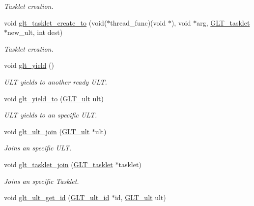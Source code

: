 \begin{DoxyCompactItemize}
\begin{DoxyCompactList}\small\item\em Tasklet creation. \end{DoxyCompactList}\item 
void \hyperlink{group__WORKUNIT_ga9f8fd228ad209b2086c4c6674d8186b2}{glt\-\_\-tasklet\-\_\-create\-\_\-to} (void($\ast$thread\-\_\-func)(void $\ast$), void $\ast$arg, \hyperlink{group__OBJECTS_gaea74ef1c9247a6c3f8f9aa243ec3491c}{G\-L\-T\-\_\-tasklet} $\ast$new\-\_\-ult, int dest)
\begin{DoxyCompactList}\small\item\em Tasklet creation. \end{DoxyCompactList}\item 
void \hyperlink{group__WORKUNIT_gac1358e0fbff9e9d05087ec4cbe7b40fc}{glt\-\_\-yield} ()
\begin{DoxyCompactList}\small\item\em U\-L\-T yields to another ready U\-L\-T. \end{DoxyCompactList}\item 
void \hyperlink{group__WORKUNIT_gaa66f172d44a8672ae737905e8f19bda2}{glt\-\_\-yield\-\_\-to} (\hyperlink{group__OBJECTS_gaa560da37f581d1cbf86b736270c7d78c}{G\-L\-T\-\_\-ult} ult)
\begin{DoxyCompactList}\small\item\em U\-L\-T yields to an specific U\-L\-T. \end{DoxyCompactList}\item 
void \hyperlink{group__WORKUNIT_ga4ea711dfc5c1244bdc256bbcb31f8193}{glt\-\_\-ult\-\_\-join} (\hyperlink{group__OBJECTS_gaa560da37f581d1cbf86b736270c7d78c}{G\-L\-T\-\_\-ult} $\ast$ult)
\begin{DoxyCompactList}\small\item\em Joins an specific U\-L\-T. \end{DoxyCompactList}\item 
void \hyperlink{group__WORKUNIT_gaeaca9573cad24b9fd6bf5b827a22e3e3}{glt\-\_\-tasklet\-\_\-join} (\hyperlink{group__OBJECTS_gaea74ef1c9247a6c3f8f9aa243ec3491c}{G\-L\-T\-\_\-tasklet} $\ast$tasklet)
\begin{DoxyCompactList}\small\item\em Joins an specific Tasklet. \end{DoxyCompactList}\item 
void \hyperlink{group__WORKUNIT_ga288c26892d7ff66b10cefbcbd2460e89}{glt\-\_\-ult\-\_\-get\-\_\-id} (\hyperlink{group__OBJECTS_ga589bca88e2454a81e6b0a5d96b54428f}{G\-L\-T\-\_\-ult\-\_\-id} $\ast$id, \hyperlink{group__OBJECTS_gaa560da37f581d1cbf86b736270c7d78c}{G\-L\-T\-\_\-ult} ult)

\end{DoxyCompactItemize}
